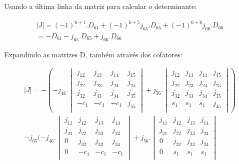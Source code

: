 Usando a última linha da matriz para calcular o determinante:

\begin{equation}
\begin{gathered}
    |J| = (-1)^{6+1}.D_{61} + (-1)^{6+5}j_{65}.D_{65} + (-1)^{6+6}j_{66}.D_{66} \\
    = -D_{61} - j_{65}.D_{65} + j_{66}.D_{66}
\end{gathered}
\end{equation}

Expandindo as matrizes D, também através dos cofatores:

\begin{equation}
\begin{gathered}
    |J| = -(-j_{46}.\begin{vmatrix}
        j_{12} & j_{13} & j_{14} & j_{15} \\
        j_{22} & j_{23} & j_{24} & j_{25} \\
        j_{32} & j_{33} & j_{34} & j_{35} \\
        -c_1 & -c_1 & -c_1 & j_{55} \\
    \end{vmatrix} + j_{56}.\begin{vmatrix}
        j_{12} & j_{13} & j_{14} & j_{15} \\
        j_{22} & j_{23} & j_{24} & j_{25} \\
        j_{32} & j_{33} & j_{34} & j_{35} \\
        s_1 & s_1 & s_1 & j_{45} \\
    \end{vmatrix}) \\
    - j_{65}(-j_{46}.\begin{vmatrix}
        j_{11} & j_{12} & j_{13} & j_{14} \\
        j_{21} & j_{22} & j_{23} & j_{24} \\
           0   & j_{32} & j_{33} & j_{34} \\
           0   & -c_1 & -c_1 & -c_1 \\        
    \end{vmatrix} + j_{56}.\begin{vmatrix}
        j_{11} & j_{12} & j_{13} & j_{14} \\
        j_{21} & j_{22} & j_{23} & j_{24} \\
           0   & j_{32} & j_{33} & j_{34} \\
           0   & s_1 & s_1 & s_1 \\                

\end{vmatrix}
\end{gathered}
\end{equation}
